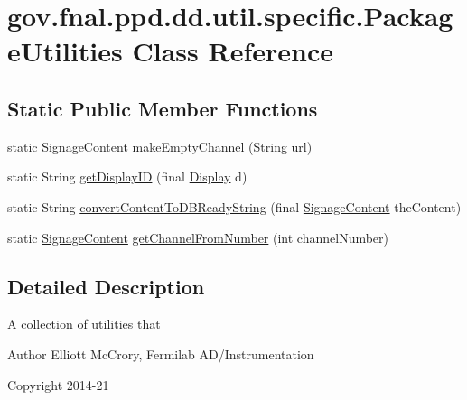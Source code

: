 \hypertarget{classgov_1_1fnal_1_1ppd_1_1dd_1_1util_1_1specific_1_1PackageUtilities}{\section{gov.\-fnal.\-ppd.\-dd.\-util.\-specific.\-Package\-Utilities Class Reference}
\label{classgov_1_1fnal_1_1ppd_1_1dd_1_1util_1_1specific_1_1PackageUtilities}
}
\subsection*{Static Public Member Functions}
\begin{DoxyCompactItemize}
\item 
static \hyperlink{interfacegov_1_1fnal_1_1ppd_1_1dd_1_1signage_1_1SignageContent}{Signage\-Content} \hyperlink{classgov_1_1fnal_1_1ppd_1_1dd_1_1util_1_1specific_1_1PackageUtilities_a21b0b417b695336725658a6fde76b042}{make\-Empty\-Channel} (String url)
\item 
static String \hyperlink{classgov_1_1fnal_1_1ppd_1_1dd_1_1util_1_1specific_1_1PackageUtilities_ac76f976bf20f252c63f3fe1a5e934d55}{get\-Display\-I\-D} (final \hyperlink{interfacegov_1_1fnal_1_1ppd_1_1dd_1_1signage_1_1Display}{Display} d)
\item 
static String \hyperlink{classgov_1_1fnal_1_1ppd_1_1dd_1_1util_1_1specific_1_1PackageUtilities_a77b0bd55fcfdef42895b14ee8fd86e1b}{convert\-Content\-To\-D\-B\-Ready\-String} (final \hyperlink{interfacegov_1_1fnal_1_1ppd_1_1dd_1_1signage_1_1SignageContent}{Signage\-Content} the\-Content)
\item 
static \hyperlink{interfacegov_1_1fnal_1_1ppd_1_1dd_1_1signage_1_1SignageContent}{Signage\-Content} \hyperlink{classgov_1_1fnal_1_1ppd_1_1dd_1_1util_1_1specific_1_1PackageUtilities_aed411058ce30f98adc137f40cfa053f8}{get\-Channel\-From\-Number} (int channel\-Number)
\end{DoxyCompactItemize}


\subsection{Detailed Description}
A collection of utilities that

\begin{DoxyAuthor}{Author}
Elliott Mc\-Crory, Fermilab A\-D/\-Instrumentation 
\end{DoxyAuthor}
\begin{DoxyCopyright}{Copyright}
2014-\/21 
\end{DoxyCopyright}


